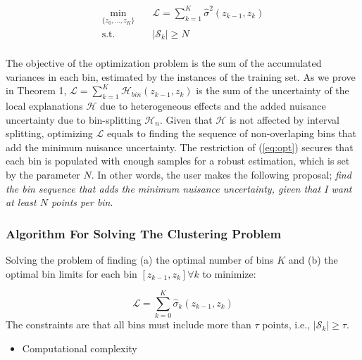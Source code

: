 \documentclass[twoside]{article}
\begin{document}
\begin{equation}
  \label{eq:opt}
\begin{aligned}
\min_{ \{z_0, \ldots, z_K\}} \quad & \mathcal{L} = \sum_{k=1}^K \hat{\sigma}^2(z_{k-1}, z_k) \\
\textrm{s.t.} \quad & |\mathcal{S}_k| \geq N\\
\end{aligned}
\end{equation}

The objective of the optimization problem is the sum of the
accumulated variances in each bin, estimated by the instances of the
training set. As we prove in Theorem 1,
\(\mathcal{L} = \sum_{k=1}^K \mathcal{H}_{bin}(z_{k-1}, z_k)\) is the
sum of the uncertainty of the local explanations \(\mathcal{H}\) due
to heterogeneous effects and the added nuisance uncertainty due to
bin-splitting \(\mathcal{H}_n\). Given that \(\mathcal{H}\) is not
affected by interval splitting, optimizing \(\mathcal{L}\) equals to
finding the sequence of non-overlaping bins that add the minimum
nuisance uncertainty. The restriction of (\ref{eq:opt}) secures that
each bin is populated with enough samples for a robust estimation,
which is set by the parameter \(N\). In other words, the user makes
the following proposal; \textit{find the bin sequence that adds the
  minimum nuisance uncertainty, given that I want at least \(N\)
  points per bin}.

\subsubsection{Algorithm For Solving The Clustering Problem}
\label{sec:dynamic-programing}

Solving the problem of finding (a) the optimal number of bins \(K\)
and (b) the optimal bin limits for each bin
\([z_{k-1}, z_k] \forall k\) to minimize:

\begin{equation}
  \label{eq:1}
  \mathcal{L} = \sum_{k=0}^K \hat{\sigma}_k(z_{k-1}, z_k)
\end{equation}
%
The constraints are that all bins must include more than \(\tau\)
points, i.e., \(|\mathcal{S}_k| \geq \tau\).

\noindent

\begin{itemize}
\item Computational complexity
\end{itemize}
\end{document}
